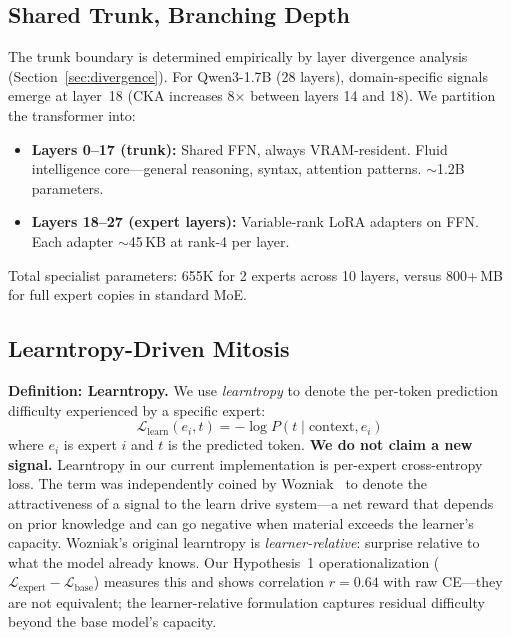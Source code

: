 \documentclass{article}
\begin{document}
\subsection{Shared Trunk, Branching Depth}

The trunk boundary is determined empirically by layer divergence analysis
(Section~\ref{sec:divergence}). For Qwen3-1.7B (28 layers), domain-specific
signals emerge at layer~18 (CKA increases 8$\times$ between layers 14 and 18).
We partition the transformer into:
\begin{itemize}
    \item \textbf{Layers 0--17 (trunk):} Shared FFN, always VRAM-resident.
          Fluid intelligence core---general reasoning, syntax, attention
          patterns. $\sim$1.2B parameters.
    \item \textbf{Layers 18--27 (expert layers):} Variable-rank LoRA adapters
          on FFN. Each adapter $\sim$45\,KB at rank-4 per layer.
\end{itemize}
Total specialist parameters: 655K for 2 experts across 10 layers, versus
800+\,MB for full expert copies in standard MoE.

\subsection{Learntropy-Driven Mitosis}

\textbf{Definition: Learntropy.} We use \emph{learntropy} to denote the per-token prediction difficulty experienced by a specific expert:
\begin{equation}
\mathcal{L}_{\text{learn}}(e_i, t) = -\log P(t \mid \text{context}, e_i)
\end{equation}
where $e_i$ is expert $i$ and $t$ is the predicted token. \textbf{We do
not claim a new signal.} Learntropy in our current implementation is
per-expert cross-entropy loss. The term was independently coined by
Wozniak~\cite{wozniak2018learntropy} to denote the attractiveness of a
signal to the learn drive system---a net reward that depends on prior
knowledge and can go negative when material exceeds the learner's
capacity. Wozniak's original learntropy is \emph{learner-relative}:
surprise relative to what the model already knows. Our Hypothesis~1
operationalization ($\mathcal{L}_{\text{expert}} - \mathcal{L}_{\text{base}}$)
measures this and shows correlation $r = 0.64$ with raw CE---they are
not equivalent; the learner-relative formulation captures residual
difficulty beyond the base model's capacity.
\end{document}
